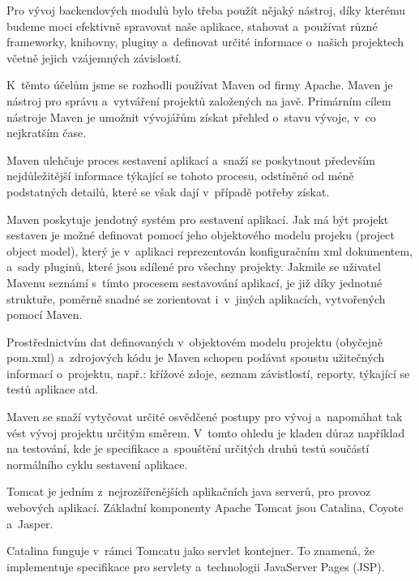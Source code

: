 \documentclass[12pt]{article}
\begin{document}
{

Pro vývoj backendových modulů bylo třeba použít nějaký nástroj,
díky kterému budeme moci efektivně spravovat naše aplikace,
stahovat a~používat různé frameworky, knihovny, pluginy 
a~definovat určité informace o~našich projektech včetně jejich vzájemných závislostí. 

K~těmto účelům jsme se rozhodli používat Maven od firmy Apache.
Maven je nástroj pro správu a~vytváření projektů založených na javě.
Primárním cílem nástroje Maven je umožnit vývojářům získat přehled o~stavu 
vývoje, v~co nejkratším čase. 

Maven ulehčuje proces sestavení aplikací a~snaží se poskytnout především 
nejdůležitější informace týkající se tohoto procesu,
odstíněné od méně podstatných detailů,
které se však dají v~případě potřeby získat. 

Maven poskytuje jendotný systém pro sestavení aplikací. 
Jak má být projekt sestaven je možné definovat pomocí 
jeho objektového modelu projeku (project object model),
který je v~aplikaci reprezentován konfiguračním xml dokumentem, 
a~sady pluginů, které jsou sdílené pro všechny projekty.
Jakmile se uživatel Mavenu seznámí s~tímto procesem sestavování aplikací,
je již díky jednotné struktuře, poměrně snadné se zorientovat i~v~jiných aplikacích,
vytvořených pomocí Maven.

Prostřednictvím dat definovaných v~objektovém modelu projektu (obyčejně pom.xml)
a~zdrojových kódu je Maven schopen podávat spoustu užitečných informací o~projektu,
např.: křížové zdoje, seznam závistlostí, reporty, týkající se testů aplikace atd.

Maven se snaží vytyčovat určité osvědčené postupy pro vývoj
a~napomáhat tak vést vývoj projektu určitým směrem. 
V~tomto ohledu je kladen důraz například na testování,
kde je specifikace a~spouštění určitých druhů testů
součástí normálního cyklu sestavení aplikace.



Tomcat je jedním z~nejrozšířenějších aplikačních java serverů, 
pro provoz webových aplikací. 
Základní komponenty Apache Tomcat jsou Catalina, Coyote a~Jasper.

Catalina funguje v~rámci Tomcatu jako servlet kontejner. 
To znamená, že implementuje specifikace pro servlety a~technologii JavaServer Pages (JSP).

}
\end{document}
